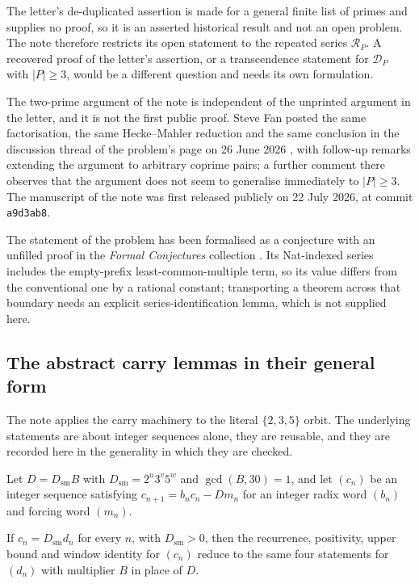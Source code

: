 \documentclass[11pt]{article}
\begin{document}
The letter's de-duplicated assertion is made for a general finite list of
primes and supplies no proof, so it is an asserted historical result and not an
open problem.  The note therefore restricts its open statement to the repeated
series $\mathcal R_P$.  A recovered proof of the letter's assertion, or a
transcendence statement for $\mathcal D_P$ with $|P|\ge3$, would be a different
question and needs its own formulation.

The two-prime argument of the note is independent of the unprinted argument in
the letter, and it is not the first public proof.  Steve Fan posted the same
factorisation, the same Hecke--Mahler reduction and the same conclusion in the
discussion thread of the problem's page on 26 June 2026
\cite{fan2026comment}, with follow-up remarks extending the argument to
arbitrary coprime pairs; a further comment there observes that the argument
does not seem to generalise immediately to $|P|\ge3$.  The manuscript of the
note was first released publicly on 22 July 2026, at commit \texttt{a9d3ab8}.

The statement of the problem has been formalised as a conjecture with an
unfilled proof in the \emph{Formal Conjectures} collection
\cite{formalconjectures269}.  Its Nat-indexed series includes the empty-prefix
least-common-multiple term, so its value differs from the conventional one by a
rational constant; transporting a theorem across that boundary needs an
explicit series-identification lemma, which is not supplied here.

\subsection{The abstract carry lemmas in their general form}
\label{long269:long:general-carries}

The note applies the carry machinery to the literal $\{2,3,5\}$ orbit.  The
underlying statements are about integer sequences alone, they are reusable, and
they are recorded here in the generality in which they are checked.

Let $D=D_{\mathrm{sm}}B$ with $D_{\mathrm{sm}}=2^{u}3^{v}5^{w}$ and
$\gcd(B,30)=1$, and let $(c_n)$ be an integer sequence satisfying
$c_{n+1}=b_nc_n-Dm_n$ for an integer radix word $(b_n)$ and forcing word
$(m_n)$.

\begin{proposition}
\label{long269:long:denominator-reduction}
If $c_n=D_{\mathrm{sm}}d_n$ for every $n$, with $D_{\mathrm{sm}}>0$, then the
recurrence, positivity, upper bound and window identity for $(c_n)$ reduce to
the same four statements for $(d_n)$ with multiplier $B$ in place of $D$.
\end{proposition}
\end{document}
